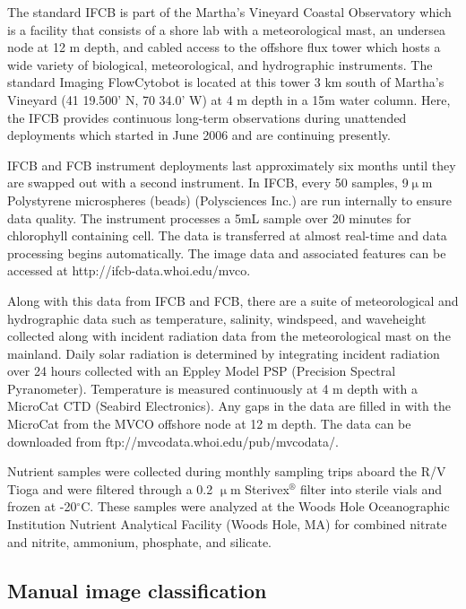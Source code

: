 The standard IFCB is part of the Martha's Vineyard Coastal Observatory which is a facility that consists of a shore lab with a meteorological mast, an undersea node at 12 m depth, and cabled access to the offshore flux tower which hosts a wide variety of biological, meteorological, and hydrographic instruments. The standard Imaging FlowCytobot is located at this tower 3 km south of Martha's Vineyard (41 19.500' N, 70 34.0' W) at 4 m depth in a 15m water column. Here, the IFCB provides continuous long-term observations during unattended deployments which started in June 2006 and are continuing presently.

IFCB and FCB instrument deployments last approximately six months until they are swapped out with a second instrument. In IFCB, every 50 samples, 9$\upmu$m  Polystyrene microspheres (beads) (Polysciences Inc.) are run internally to ensure data quality. The instrument processes a 5mL sample over 20 minutes for chlorophyll containing cell. The data is transferred at almost real-time and data processing begins automatically. The image data and associated features can be accessed at http://ifcb-data.whoi.edu/mvco. 

Along with this data from IFCB and FCB, there are a suite of meteorological and hydrographic data such as temperature, salinity, windspeed, and waveheight collected along with incident radiation data from the meteorological mast on the mainland. Daily solar radiation is determined by integrating incident radiation over 24 hours collected with an Eppley Model PSP (Precision Spectral Pyranometer). Temperature is measured continuously at 4 m depth with a MicroCat CTD (Seabird Electronics). Any gaps in the data are filled in with the MicroCat from the MVCO offshore node at 12 m depth. The data can be downloaded from ftp://mvcodata.whoi.edu/pub/mvcodata/.

Nutrient samples were collected during monthly sampling trips aboard the R/V Tioga and were filtered through a 0.2 $\upmu$m Sterivex$^{\circledR}$ filter into sterile vials and frozen at -20$^{\circ}$C. These samples were analyzed at the Woods Hole Oceanographic Institution Nutrient Analytical Facility (Woods Hole, MA) for combined nitrate and nitrite, ammonium, phosphate, and silicate.

\subsection{Manual image classification}

